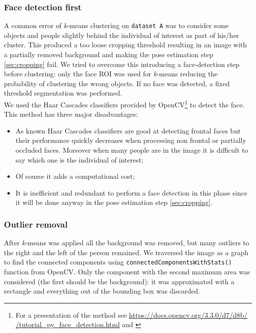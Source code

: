 \documentclass{article}
\begin{document}
\subsubsection{Face detection first}
A common error of \textit{k}-means clustering on \verb|dataset A| was to consider some objects and people slightly behind the individual of interest as part of his/her cluster. This produced a too loose cropping threshold resulting in an image with a partially removed background and making the pose estimation step \ref{sec:cropping} fail. We tried to overcome this introducing a face-detection step before clustering: only the face ROI was used for \textit{k}-means reducing the probability of clustering the wrong objects. If no face was detected, a fixed threshold segmentation was performed. \\
We used the Haar Cascades classifiers provided by OpenCV\footnote{For a presentation of the method see \href{https://docs.opencv.org/3.3.0/d7/d8b/tutorial_py_face_detection.html}{https://docs.opencv.org/3.3.0/d7/d8b/ \\
/tutorial\_py\_face\_detection.html} and \citep{ViolaJones}} to detect the face. \\
This method has three major disadvantages:
\begin{itemize}
	\item As known Haar Cascades classifiers are good at detecting frontal faces but their performance quickly decreases when processing non frontal or partially occluded faces. Moreover when many people are in the image it is difficult to say which one is the individual of interest;
	\item Of course it adds a computational cost;
	\item It is inefficient and redundant to perform a face detection in this phase since it will be done anyway in the pose estimation step \ref{sec:cropping}.
\end{itemize}

\subsubsection{Outlier removal}
After \textit{k}-means was applied all the background was removed, but many outliers to the right and the left of the person remained.
We traversed the image as a graph to find the connected components using \verb|connectedComponentsWithStats()| function from OpenCV. Only the component with the second maximum area was considered (the first should be the background): it was approximated with a rectangle and everything out of the bounding box was discarded.
\end{document}
